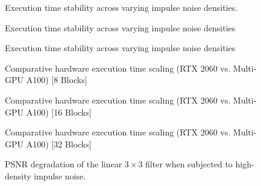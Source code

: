 \documentclass[conference]{IEEEtran}
\numberwithin{figure}{section}
\numberwithin{table}{section}
\begin{document}
\begin{figure}[htbp]
    
    \caption{Execution time stability across varying impulse noise densities.}
    \label{fig:simd_determinism_2}
\end{figure}

\begin{figure}[htbp]
    
    \caption{Execution time stability across varying impulse noise densities}
    \label{fig:simd_determinism_3}
\end{figure}

\begin{figure}[htbp]
    
    \caption{Execution time stability across varying impulse noise densities}
    \label{fig:simd_determinism_2060}
\end{figure}

\begin{figure}[htbp]
    \centering
    
    \caption{Comparative hardware execution time scaling (RTX 2060 vs. Multi-GPU A100) [8 Blocks]}
    \label{fig:Comparison_1}
\end{figure}

\begin{figure}[htbp]
    \centering
    
    \caption{Comparative hardware execution time scaling (RTX 2060 vs. Multi-GPU A100) [16 Blocks]}
    \label{fig:Comparison_2}
\end{figure}

\begin{figure}[htbp]
    
    \caption{Comparative hardware execution time scaling (RTX 2060 vs. Multi-GPU A100) [32 Blocks]}
    \label{fig:Comparison_3}
\end{figure}

\begin{figure}[htbp]
    \centering
    
    \caption{PSNR degradation of the linear $3\times3$ filter when subjected to high-density impulse noise.}
    \label{fig:psnr_degradation_1}
\end{figure}
\end{document}
